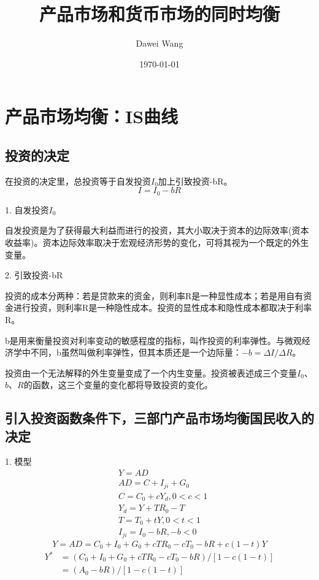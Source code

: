 \documentclass{article}
\title{产品市场和货币市场的同时均衡}
\author{Dawei Wang}
\date{\today}
\begin{document}
	\maketitle
\section{产品市场均衡：IS曲线}
\subsection{投资的决定}
在投资的决定里，总投资等于自发投资$ I_0 $加上引致投资-bR。
\[
I=I_0-bR
\]

1. 自发投资$ I_0 $

自发投资是为了获得最大利益而进行的投资，其大小取决于资本的边际效率(资本收益率)。资本边际效率取决于宏观经济形势的变化，可将其视为一个既定的外生变量。

\hspace*{\fill}

2. 引致投资-bR

投资的成本分两种：若是贷款来的资金，则利率R是一种显性成本；若是用自有资金进行投资，则利率R是一种隐性成本。投资的显性成本和隐性成本都取决于利率R。

b是用来衡量投资对利率变动的敏感程度的指标，叫作投资的利率弹性。与微观经济学中不同，b虽然叫做利率弹性，但其本质还是一个边际量：$ -b=\Delta I/\Delta R $。

\hspace*{\fill}

投资由一个无法解释的外生变量变成了一个内生变量。投资被表述成三个变量$ I_0 $、$ b $、$ R $的函数，这三个变量的变化都将导致投资的变化。

\subsection{引入投资函数条件下，三部门产品市场均衡国民收入的决定}
1. 模型
\begin{equation*}
	\begin{split}
	&Y=AD\\
	&AD=C+I_{ji}+G_0\\
	&C=C_0+cY_d,0<c<1\\
	&Y_d=Y+TR_0-T\\
	&T=T_0+tY,0<t<1\\
	&I_{ji}=I_0-bR,-b<0
	\end{split}
\end{equation*}
\[
Y=AD=C_0+I_0+G_0+cTR_0-cT_0-bR+c(1-t)Y
\]
\begin{equation*}
	\begin{split}
	Y^*&=(C_0+I_0+G_0+cTR_0-cT_0-bR)/[1-c(1-t)]\\
	&=(A_0-bR)/[1-c(1-t)]	
	\end{split}
\end{equation*}
\end{document}
